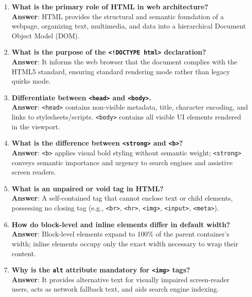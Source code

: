 \begin{enumerate}[leftmargin=1.5em]
    \item \textbf{What is the primary role of HTML in web architecture?}\\
    \textbf{Answer}: HTML provides the structural and semantic foundation of a webpage, organizing text, multimedia, and data into a hierarchical Document Object Model (DOM).

    \item \textbf{What is the purpose of the \texttt{<!DOCTYPE html>} declaration?}\\
    \textbf{Answer}: It informs the web browser that the document complies with the HTML5 standard, ensuring standard rendering mode rather than legacy quirks mode.

    \item \textbf{Differentiate between \texttt{<head>} and \texttt{<body>}.}\\
    \textbf{Answer}: \texttt{<head>} contains non-visible metadata, title, character encoding, and links to stylesheets/scripts. \texttt{<body>} contains all visible UI elements rendered in the viewport.

    \item \textbf{What is the difference between \texttt{<strong>} and \texttt{<b>}?}\\
    \textbf{Answer}: \texttt{<b>} applies visual bold styling without semantic weight; \texttt{<strong>} conveys semantic importance and urgency to search engines and assistive screen readers.

    \item \textbf{What is an unpaired or void tag in HTML?}\\
    \textbf{Answer}: A self-contained tag that cannot enclose text or child elements, possessing no closing tag (e.g., \texttt{<br>}, \texttt{<hr>}, \texttt{<img>}, \texttt{<input>}, \texttt{<meta>}).

    \item \textbf{How do block-level and inline elements differ in default width?}\\
    \textbf{Answer}: Block-level elements expand to 100\% of the parent container's width; inline elements occupy only the exact width necessary to wrap their content.

    \item \textbf{Why is the \texttt{alt} attribute mandatory for \texttt{<img>} tags?}\\
    \textbf{Answer}: It provides alternative text for visually impaired screen-reader users, acts as network fallback text, and aids search engine indexing.


\end{enumerate}
